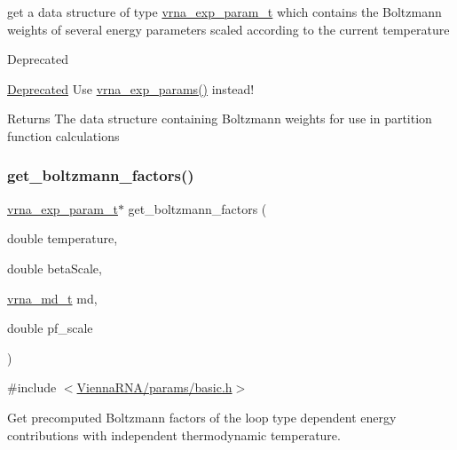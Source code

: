 get a data structure of type \mbox{\hyperlink{group__energy__parameters_ga01d8b92fe734df8d79a6169482c7d8d8}{vrna\+\_\+exp\+\_\+param\+\_\+t}} which contains the Boltzmann weights of several energy parameters scaled according to the current temperature

\begin{DoxyRefDesc}{Deprecated}
\item[\mbox{\hyperlink{deprecated__deprecated000142}{Deprecated}}]Use \mbox{\hyperlink{group__energy__parameters_gab1f3016f96aa96bff020cdd904605afa}{vrna\+\_\+exp\+\_\+params()}} instead!\end{DoxyRefDesc}


\begin{DoxyReturn}{Returns}
The data structure containing Boltzmann weights for use in partition function calculations 
\end{DoxyReturn}
\mbox{\label{group__energy__parameters_gaef2b931c7e9d4ffb0a5c33df50ec2068}} 
\subsubsection{\texorpdfstring{get\_boltzmann\_factors()}{get\_boltzmann\_factors()}}
{\footnotesize\ttfamily \mbox{\hyperlink{group__energy__parameters_ga01d8b92fe734df8d79a6169482c7d8d8}{vrna\+\_\+exp\+\_\+param\+\_\+t}}$\ast$ get\+\_\+boltzmann\+\_\+factors (\begin{DoxyParamCaption}\item[{double}]{temperature,  }\item[{double}]{beta\+Scale,  }\item[{\mbox{\hyperlink{group__model__details_ga1f8a10e12a0a1915f2a4eff0b28ea17c}{vrna\+\_\+md\+\_\+t}}}]{md,  }\item[{double}]{pf\+\_\+scale }\end{DoxyParamCaption})}



{\ttfamily \#include $<$\mbox{\hyperlink{params_2basic_8h}{Vienna\+R\+N\+A/params/basic.\+h}}$>$}



Get precomputed Boltzmann factors of the loop type dependent energy contributions with independent thermodynamic temperature. 

